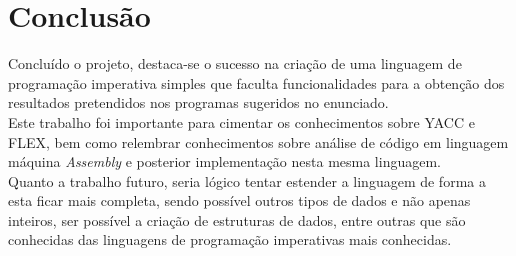 \documentclass{report}
\begin{document}
\chapter{Conclusão} \label{concl}
Concluído o projeto, destaca-se o sucesso na criação de uma linguagem de programação imperativa simples que faculta funcionalidades para a obtenção dos resultados pretendidos nos programas sugeridos no enunciado.\\
Este trabalho foi importante para cimentar os conhecimentos sobre YACC e FLEX, bem como relembrar conhecimentos sobre análise de código em linguagem máquina \textit{Assembly} e posterior implementação nesta mesma linguagem.\\
Quanto a trabalho futuro, seria lógico tentar estender a linguagem de forma a esta ficar mais completa, sendo possível outros tipos de dados e não apenas inteiros, ser possível a criação de estruturas de dados, entre outras que são conhecidas das linguagens de programação imperativas mais conhecidas.
\end{document}
